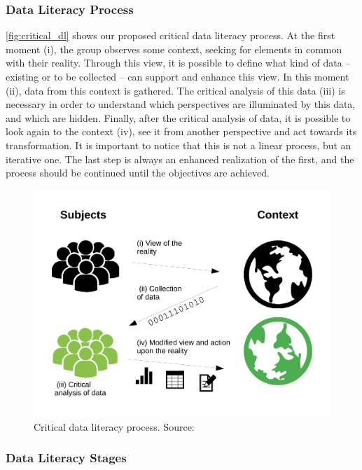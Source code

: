 \subsubsection{Data Literacy Process}

\autoref{fig:critical_dl} shows our proposed critical data literacy process. At the first moment (i), the group observes some context, seeking for elements in common with their reality. Through this view, it is possible to define what kind of data – existing or to be collected – can support and enhance this view. In this moment (ii), data from this context is gathered. The critical analysis of this data (iii) is necessary in order to understand which perspectives are illuminated by this data, and which are hidden. Finally, after the critical analysis of data, it is possible to look again to the context (iv), see it from another perspective and act towards its transformation. It is important to notice that this is not a linear process, but an iterative one. The last step is always an enhanced realization of the first, and the process should be continued until the objectives are achieved.

\begin{figure}[h!]
\begin{center}
\includegraphics[width=\columnwidth]{images/critica_data_literacy}
\caption[Critical data literacy process.]{Critical data literacy process. Source:~}
\label{fig:critical_dl}
\end{center}
\end{figure}

\subsubsection{Data Literacy Stages}


